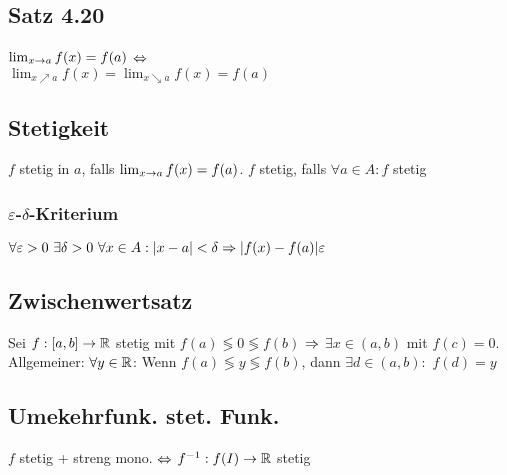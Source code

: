 \subsection*{Satz 4.20}
$\lim_{x \rightarrow a} f(x) = f(a) $ $\Leftrightarrow$\\ $\lim_{x \nearrow a} f(x) = \lim_{x \searrow a} f(x) = f(a)$
\subsection*{Stetigkeit}
$f$ stetig in $a$, falls $\lim_{x \rightarrow a} f(x) = f(a)$. $f$ stetig, falls $\forall a \in A: f$ stetig
\subsubsection*{\texorpdfstring{$\varepsilon$}{Epsilon}-\texorpdfstring{$\delta$}{Delta}-Kriterium}
$\forall \varepsilon > 0 \ \exists \delta > 0 \ \forall x \in A: |x- a| < \delta \Rightarrow |f(x) - f(a)| \varepsilon$
\subsection*{Zwischenwertsatz}
Sei $f: [a, b] \rightarrow \mathbb R$ stetig mit $f(a) \lessgtr 0 \lessgtr f(b)$ $\Rightarrow$ $\exists x \in (a, b)$ mit $f(c)= 0$.\\
Allgemeiner: $\forall y \in\mathbb R$: Wenn $f(a) \lessgtr y \lessgtr f(b)$, dann $\exists d \in (a, b):$ $f(d) = y$
\subsection*{Umekehrfunk. stet. Funk.}
$f$ stetig + streng mono. $\Leftrightarrow$ $f^{-1}:f(I)\rightarrow \mathbb R$ stetig
